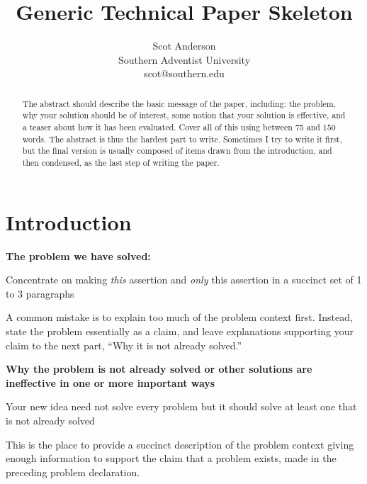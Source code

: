 \documentclass[pdf,bookmarks,colorlinks=true]{IEEEtran}
\title{\bf Generic Technical Paper Skeleton}
\author{Scot Anderson\\
Southern Adventist University\\
scot@southern.edu
}
\begin{document}
\maketitle

\begin{abstract}

The abstract should describe the basic message of the paper, including: the 
problem, why your solution should be of interest, some notion that your
solution is effective, and a teaser about how it has been evaluated. Cover all
of this using between 75 and 150 words. The abstract is thus the hardest part
to write. Sometimes I try to write it first, but the final version is usually
composed of items drawn from the introduction, and then condensed, as the last
step of writing the paper.

\end{abstract}



\section{Introduction}
\label{sec:Introduction}

\textbf{The problem we have solved:}

Concentrate on making {\em this} assertion and {\em only} this assertion in a
succinct set of 1 to 3 paragraphs

A common mistake is to explain too much of the problem context first. Instead,
state the problem essentially as a claim, and leave explanations supporting
your claim to the next part, ``Why it is not already solved.''



\textbf{Why the problem is not already solved or other solutions
are ineffective in one or more important ways}

Your new idea need not solve every problem but it should solve at least one
that is not already solved

This is the place to provide a succinct description of the problem context
giving enough information to support the claim that a problem exists, made in
the preceding problem declaration.
\end{document}
